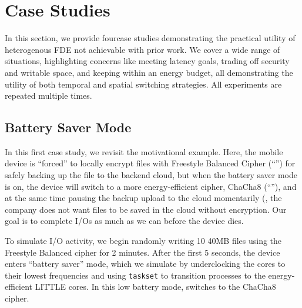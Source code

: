 \section{Case Studies}\label{sec:usecases}

In this section, we provide four\xxx case studies demonstrating the practical
utility of heterogenous FDE not achievable with prior work. We cover a wide
range of situations, highlighting concerns like meeting latency goals, trading
off security and writable space, and keeping within an energy budget, all
demonstrating the utility of both temporal and spatial switching strategies. All
experiments are repeated multiple times.


\subsection{Battery Saver Mode}\label{subsec:uc1}

In this first case study, we revisit the motivational example.  Here, the mobile
device is ``forced'' to locally encrypt files with Freestyle Balanced Cipher
(``\cone'') for safely backing up the file to the backend cloud, but when the
battery saver mode is on, the device will switch to a more energy-efficient
cipher, ChaCha8 (``\ctwo''), and at the same time pausing the backup upload to
the cloud momentarily (\eg, the company does not want files to be saved in the
cloud without \cone encryption. Our goal is to complete I/Os as much as we can
before the device dies. 

To simulate I/O activity, we begin randomly writing 10 40MB files using the
Freestyle Balanced cipher for 2 minutes.  After the first 5 seconds, the device
enters ``battery saver'' mode, which we simulate by underclocking the cores to
their lowest frequencies and using \texttt{taskset} to transition \sys processes
to the energy-efficient LITTLE cores.  In this low battery mode, \sys switches
to the ChaCha8 cipher.



